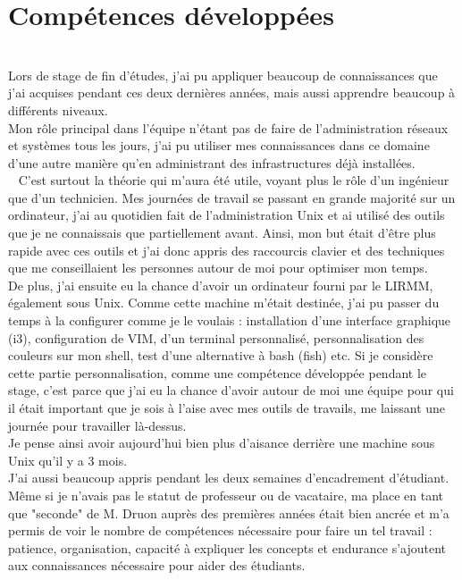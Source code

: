 \documentclass[11pt,french,a4paper]{report}
\begin{document}
    \section{Compétences développées} \\
Lors de stage de fin d'études, j'ai pu appliquer beaucoup de connaissances que j'ai acquises pendant ces deux dernières années,
mais aussi apprendre beaucoup à différents niveaux.\\
Mon rôle principal dans l'équipe n'étant pas de faire de l'administration réseaux et systèmes tous les jours, 
j'ai pu utiliser mes connaissances dans ce domaine d'une autre manière qu'en administrant des infrastructures déjà installées. \\ 
C'est surtout la théorie qui m'aura été utile, voyant plus le rôle d'un ingénieur que d'un technicien. 
Mes journées de travail se passant en grande majorité sur un ordinateur, j'ai au quotidien fait de l'administration Unix et ai
utilisé des outils que je ne connaissais que partiellement avant. Ainsi, mon but était d'être plus rapide avec ces outils 
et j'ai donc appris des raccourcis clavier et des techniques que me conseillaient les personnes autour de moi pour optimiser 
mon temps. \\
De plus, j'ai ensuite eu la chance d'avoir un ordinateur fourni par le LIRMM, également sous Unix.
Comme cette machine m'était destinée, j'ai pu passer du temps à la configurer comme je le voulais : 
installation d'une interface graphique (i3), configuration de VIM, d'un terminal personnalisé, personnalisation des couleurs 
sur mon shell, test d'une alternative à bash (fish) etc. 
Si je considère cette partie personnalisation, comme une compétence développée pendant le stage, c'est parce que j'ai eu la chance 
d'avoir autour de moi une équipe pour qui il était important que je sois à l'aise avec mes outils de travails, me laissant une 
journée pour travailler là-dessus. \\
Je pense ainsi avoir aujourd'hui bien plus d'aisance derrière une machine sous Unix qu'il y a 3 mois. \\
J'ai aussi beaucoup appris pendant les deux semaines d'encadrement d'étudiant. Même si je n'avais pas le statut de professeur 
ou de vacataire, ma place en tant que "seconde" de M. Druon auprès des premières années était bien ancrée 
et m'a permis de voir le nombre de compétences nécessaire pour faire un tel travail : patience, organisation, 
capacité à expliquer les concepts et endurance s'ajoutent aux connaissances nécessaire pour aider des étudiants. 
\end{document}
